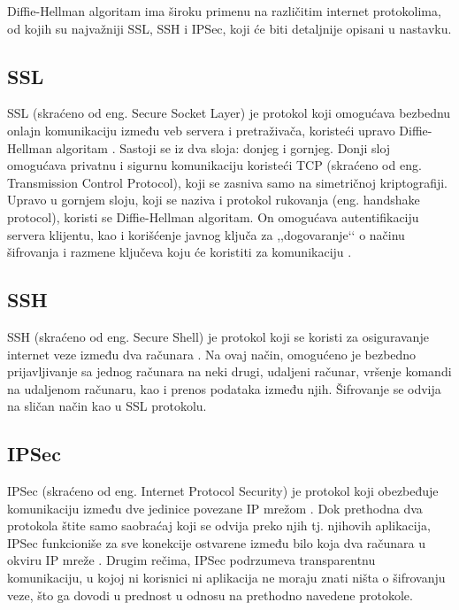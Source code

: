 \documentclass[a4paper]{article}
\begin{document}
Diffie-Hellman algoritam ima široku primenu na različitim internet protokolima, od kojih su najvažniji SSL, SSH i IPSec, koji će biti detaljnije opisani u nastavku.

\subsection{SSL}
\label{subsec:ssl}

SSL (skraćeno od eng. Secure Socket Layer) je protokol koji omogućava bezbednu onlajn komunikaciju između veb servera i pretraživača, koristeći upravo Diffie-Hellman algoritam \cite{use}. Sastoji se iz dva sloja: donjeg i gornjeg. Donji sloj omogućava privatnu i sigurnu komunikaciju koristeći TCP (skraćeno od eng. Transmission Control Protocol), koji se zasniva samo na simetričnoj kriptografiji. Upravo u gornjem sloju, koji se naziva i protokol rukovanja (eng. handshake protocol), koristi se Diffie-Hellman algoritam. On omogućava autentifikaciju servera klijentu, kao i korišćenje javnog ključa za ,,dogovaranje‘‘ o načinu šifrovanja i razmene ključeva koju će koristiti za komunikaciju \cite{use}. 


\subsection{SSH}
\label{subsec:ssh}

SSH (skraćeno od eng. Secure Shell) je protokol koji se koristi za osiguravanje internet veze između dva računara \cite{use}. Na ovaj način, omogućeno je bezbedno prijavljivanje sa jednog računara na neki drugi, udaljeni računar, vršenje komandi na udaljenom računaru, kao i prenos podataka između njih. Šifrovanje se odvija na sličan način kao u SSL protokolu.

\subsection{IPSec}
\label{subsec:ipsec}

IPSec (skraćeno od eng. Internet Protocol Security) je protokol koji obezbeđuje komunikaciju između dve jedinice povezane IP mrežom \cite{use}. Dok prethodna dva protokola štite samo saobraćaj koji se odvija preko njih tj. njihovih aplikacija, IPSec funkcioniše za sve konekcije ostvarene između bilo koja dva računara u okviru IP mreže \cite{use}. Drugim rečima, IPSec podrzumeva transparentnu komunikaciju, u kojoj ni korisnici ni aplikacija ne moraju znati ništa o šifrovanju veze, što ga dovodi u prednost u odnosu na prethodno navedene protokole.
\end{document}

